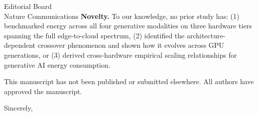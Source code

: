 \documentclass[11pt]{letter}
\begin{document}
\begin{letter}{Editorial Board\\Nature Communications}
\textbf{Novelty.} To our knowledge, no prior study has: (1) benchmarked energy across all four generative modalities on three hardware tiers spanning the full edge-to-cloud spectrum, (2) identified the architecture-dependent crossover phenomenon and shown how it evolves across GPU generations, or (3) derived cross-hardware empirical scaling relationships for generative AI energy consumption.

This manuscript has not been published or submitted elsewhere. All authors have approved the manuscript.

\closing{Sincerely,}

\end{letter}
\end{document}
